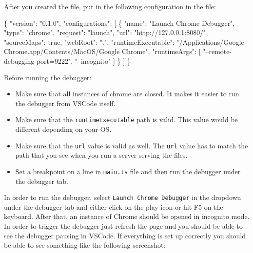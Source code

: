 \documentclass[12pt,]{article}
\newenvironment{Shaded}{}{}
\newcommand{\KeywordTok}[1]{\textcolor[rgb]{0.00,0.00,1.00}{{#1}}}
\newcommand{\DataTypeTok}[1]{{#1}}
\newcommand{\StringTok}[1]{\textcolor[rgb]{0.00,0.50,0.50}{{#1}}}
\newcommand{\OtherTok}[1]{\textcolor[rgb]{1.00,0.25,0.00}{{#1}}}
\newcommand{\FunctionTok}[1]{{#1}}
\providecommand{\tightlist}{%
  \setlength{\itemsep}{0pt}\setlength{\parskip}{0pt}}
\begin{document}
After you created the file, put in the following configuration in the
file:

\begin{Shaded}
\begin{Highlighting}[numbers=left,,]
\FunctionTok{\{}
  \DataTypeTok{"version"}\FunctionTok{:} \StringTok{"0.1.0"}\FunctionTok{,}
  \DataTypeTok{"configurations"}\FunctionTok{:} \OtherTok{[}
    \FunctionTok{\{}
      \DataTypeTok{"name"}\FunctionTok{:} \StringTok{"Launch Chrome Debugger"}\FunctionTok{,}
      \DataTypeTok{"type"}\FunctionTok{:} \StringTok{"chrome"}\FunctionTok{,}
      \DataTypeTok{"request"}\FunctionTok{:} \StringTok{"launch"}\FunctionTok{,}
      \DataTypeTok{"url"}\FunctionTok{:} \StringTok{"http://127.0.0.1:8080/"}\FunctionTok{,}
      \DataTypeTok{"sourceMaps"}\FunctionTok{:} \KeywordTok{true}\FunctionTok{,}
      \DataTypeTok{"webRoot"}\FunctionTok{:} \StringTok{"."}\FunctionTok{,}
      \DataTypeTok{"runtimeExecutable"}\FunctionTok{:} \StringTok{"/Applications/Google Chrome.app/Contents/MacOS/Google Chrome"}\FunctionTok{,}
      \DataTypeTok{"runtimeArgs"}\FunctionTok{:} \OtherTok{[}
        \StringTok{"--remote-debugging-port=9222"}\OtherTok{,}
        \StringTok{"--incognito"}
      \OtherTok{]}
    \FunctionTok{\}}
  \OtherTok{]}
\FunctionTok{\}}
\end{Highlighting}
\end{Shaded}

Before running the debugger:

\begin{itemize}
\tightlist
\item
  Make sure that all instances of chrome are closed. It makes it easier
  to run the debugger from VSCode itself.
\item
  Make sure that the \texttt{runtimeExecutable} path is valid. This
  value would be different depending on your OS.
\item
  Make sure that the \texttt{url} value is valid as well. The
  \texttt{url} value has to match the path that you see when you run a
  server serving the files.
\item
  Set a breakpoint on a line in \texttt{main.ts} file and then run the
  debugger under the debugger tab.
\end{itemize}

In order to run the debugger, select \texttt{Launch\ Chrome\ Debugger}
in the dropdown under the debugger tab and either click on the play icon
or hit F5 on the keyboard. After that, an instance of Chrome should be
opened in incognito mode. In order to trigger the debugger just refresh
the page and you should be able to see the debugger pausing in VSCode.
If everything is set up correctly you should be able to see something
like the following screenshot:
\end{document}
